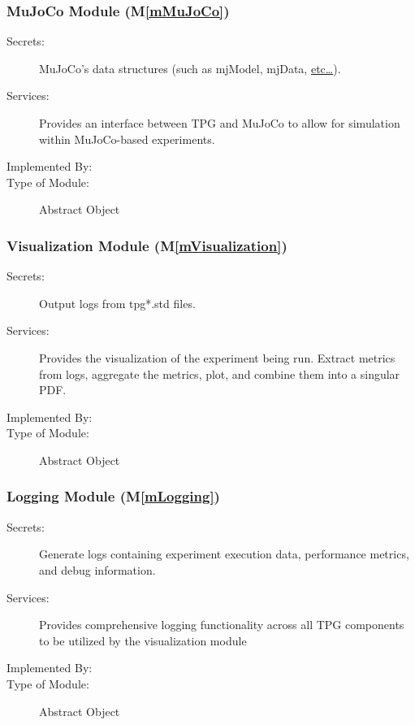 \documentclass[12pt, titlepage]{article}
\newcommand{\mref}[1]{M\ref{#1}}
\begin{document}
\subsubsection{MuJoCo Module (\mref{mMuJoCo})}

\begin{description}
\item[Secrets:]MuJoCo's data structures (such as mjModel, mjData, \href{https://mujoco.readthedocs.io/en/stable/APIreference/APItypes.html#struct-types}{etc…}).
\item[Services:]Provides an interface between TPG and MuJoCo to allow for simulation within MuJoCo-based experiments.
\item[Implemented By:] \progname{}
\item[Type of Module:] Abstract Object
\end{description}

\subsubsection{Visualization Module (\mref{mVisualization})}

\begin{description}
\item[Secrets:]Output logs from tpg*.std files.
\item[Services:]Provides the visualization of the experiment being run. Extract metrics from logs, aggregate the metrics, plot, and combine them into a singular PDF.
\item[Implemented By:] \progname{}
\item[Type of Module:] Abstract Object
\end{description}


\subsubsection{Logging Module  (\mref{mLogging})}

\begin{description}
\item[Secrets:] Generate logs containing experiment execution data, performance metrics, and debug information.
\item[Services:] Provides comprehensive logging functionality across all TPG components to be utilized by the visualization module
\item[Implemented By:] \progname{}
\item[Type of Module:] Abstract Object
\end{description}
\end{document}
